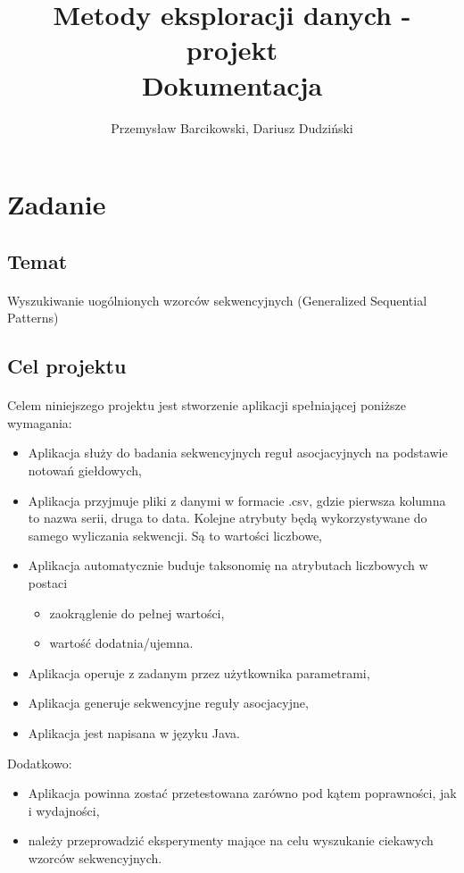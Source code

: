 \documentclass[11pt,a4paper]{article}
\title{ \textbf{Metody eksploracji danych - projekt} \\ \Large Dokumentacja}
\author{Przemysław Barcikowski, Dariusz Dudziński}
\begin{document}
\maketitle
\section{Zadanie}
\subsection{Temat}
\paragraph{} Wyszukiwanie uogólnionych wzorców sekwencyjnych (Generalized Sequential Patterns)
\subsection{Cel projektu}
\paragraph{} Celem niniejszego projektu jest stworzenie aplikacji spełniającej poniższe wymagania:
\begin{itemize}
\item Aplikacja służy do badania sekwencyjnych reguł asocjacyjnych na podstawie notowań giełdowych,
\item Aplikacja przyjmuje pliki z danymi w formacie .csv, gdzie pierwsza kolumna to nazwa serii, druga to data. Kolejne atrybuty będą wykorzystywane do samego wyliczania sekwencji. Są to wartości liczbowe,
\item Aplikacja automatycznie buduje taksonomię na atrybutach liczbowych w postaci
\begin{itemize}
\item zaokrąglenie do pełnej wartości,
\item wartość dodatnia/ujemna.
\end{itemize}
\item Aplikacja operuje z zadanym przez użytkownika parametrami,
\item Aplikacja generuje sekwencyjne reguły asocjacyjne,
\item Aplikacja jest napisana w języku Java.
\end{itemize}
Dodatkowo:
\begin{itemize}
\item Aplikacja powinna zostać przetestowana zarówno pod kątem poprawności, jak i wydajności,
\item należy przeprowadzić eksperymenty mające na celu wyszukanie ciekawych wzorców sekwencyjnych.
\end{itemize}
\newpage
\end{document}
